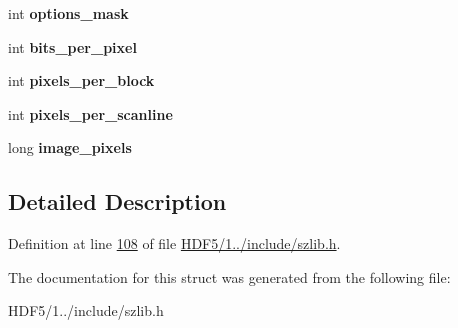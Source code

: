 \begin{DoxyCompactItemize}
\mbox{\label{structsz__stream__s_a076f8f5259b6a81abc277cba6c509a3f}} 
int {\bfseries options\+\_\+mask}
\item 
\mbox{\label{structsz__stream__s_a7d413fa4e1d94021fe2e54a9762238f3}} 
int {\bfseries bits\+\_\+per\+\_\+pixel}
\item 
\mbox{\label{structsz__stream__s_aac6ddc723eb0968c330235b2fbbc8bac}} 
int {\bfseries pixels\+\_\+per\+\_\+block}
\item 
\mbox{\label{structsz__stream__s_a6ecbd72559cb7b64017e64e59895aad0}} 
int {\bfseries pixels\+\_\+per\+\_\+scanline}
\item 
\mbox{\label{structsz__stream__s_a6185e91212141bad13f3f5d0d64f94a3}} 
long {\bfseries image\+\_\+pixels}
\end{DoxyCompactItemize}


\subsection{Detailed Description}


Definition at line \hyperlink{_h_d_f5_21_810_81_2include_2szlib_8h_source_l00108}{108} of file \hyperlink{_h_d_f5_21_810_81_2include_2szlib_8h_source}{H\+D\+F5/1../include/szlib.\+h}.



The documentation for this struct was generated from the following file\+:\begin{DoxyCompactItemize}
\item 
H\+D\+F5/1../include/szlib.\+h\end{DoxyCompactItemize}
